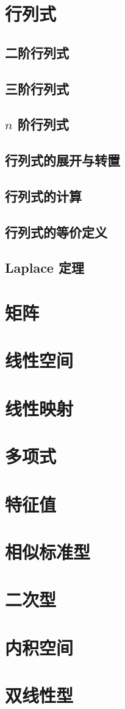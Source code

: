 \documentclass[a4paper, 11pt]{ctexbook}
\begin{document}
    \tableofcontents
    \chapter{行列式}
        \section{二阶行列式}
            
        \section{三阶行列式}
        \section{\texorpdfstring{$n$}{n} 阶行列式}
        \section{行列式的展开与转置}
        \section{行列式的计算}
        \section{行列式的等价定义}
        \section{Laplace 定理}
    \chapter{矩阵}
    \chapter{线性空间}
    \chapter{线性映射}
    \chapter{多项式}
    \chapter{特征值}
    \chapter{相似标准型}
    \chapter{二次型}
    \chapter{内积空间}
    \chapter{双线性型}
\end{document}
